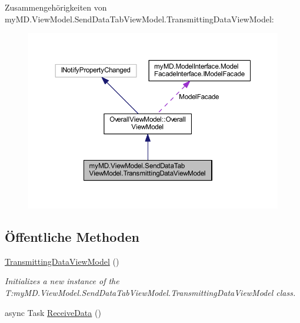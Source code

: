 Zusammengehörigkeiten von my\+M\+D.\+View\+Model.\+Send\+Data\+Tab\+View\+Model.\+Transmitting\+Data\+View\+Model\+:\nopagebreak
\begin{figure}[H]
\begin{center}
\leavevmode
\includegraphics[width=350pt]{classmy_m_d_1_1_view_model_1_1_send_data_tab_view_model_1_1_transmitting_data_view_model__coll__graph}
\end{center}
\end{figure}
\subsection*{Öffentliche Methoden}
\begin{DoxyCompactItemize}
\item 
\mbox{\hyperlink{classmy_m_d_1_1_view_model_1_1_send_data_tab_view_model_1_1_transmitting_data_view_model_a010f4e5a18f39b8df0e14fe18c13c1a3}{Transmitting\+Data\+View\+Model}} ()
\begin{DoxyCompactList}\small\item\em Initializes a new instance of the T\+:my\+M\+D.\+View\+Model.\+Send\+Data\+Tab\+View\+Model.\+Transmitting\+Data\+View\+Model class. \end{DoxyCompactList}\item 
async Task \mbox{\hyperlink{classmy_m_d_1_1_view_model_1_1_send_data_tab_view_model_1_1_transmitting_data_view_model_a03cc497c03b91bb106256b8fcd46bfbb}{Receive\+Data}} ()
\end{DoxyCompactItemize}

